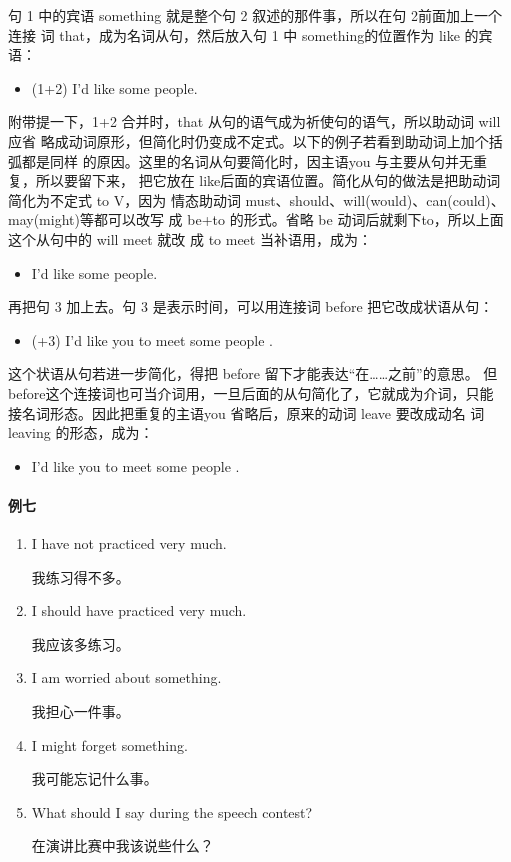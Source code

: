 句 1 中的宾语 something 就是整个句 2 叙述的那件事，所以在句 2前面加上一个连接
词 that，成为名词从句，然后放入句 1 中 something的位置作为 like 的宾语：
\begin{itemize}
\item (1+2) I'd like  some people.
\end{itemize}
附带提一下，1+2 合并时，that 从句的语气成为祈使句的语气，所以助动词 will应省
略成动词原形，但简化时仍变成不定式。以下的例子若看到助动词上加个括弧都是同样
的原因。这里的名词从句要简化时，因主语you 与主要从句并无重复，所以要留下来，
把它放在 like后面的宾语位置。简化从句的做法是把助动词简化为不定式 to V，因为
情态助动词 must、should、will(would)、can(could)、 may(might)等都可以改写
成 be+to 的形式。省略 be 动词后就剩下to，所以上面这个从句中的 will meet 就改
成 to meet 当补语用，成为：
\begin{itemize}
\item I'd like  some people.
\end{itemize}
再把句 3 加上去。句 3 是表示时间，可以用连接词 before 把它改成状语从句：
\begin{itemize}
\item (+3) I'd like you to meet some people .
\end{itemize}
这个状语从句若进一步简化，得把 before 留下才能表达“在……之前”的意思。
但 before这个连接词也可当介词用，一旦后面的从句简化了，它就成为介词，只能
接名词形态。因此把重复的主语you 省略后，原来的动词 leave 要改成动名
词 leaving 的形态，成为：
\begin{itemize}
\item I'd like you to meet some people .
\end{itemize}

\paragraph{例七}

\begin{enumerate}
\item I have not practiced very much.

  我练习得不多。
\item I should have practiced very much.

  我应该多练习。
\item I am worried about something.

  我担心一件事。
\item I might forget something.

  我可能忘记什么事。
\item What should I say during the speech contest?

  在演讲比赛中我该说些什么？
\end{enumerate}

